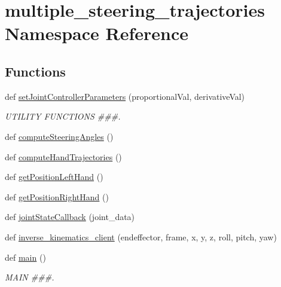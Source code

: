 \hypertarget{namespacemultiple__steering__trajectories}{}\section{multiple\+\_\+steering\+\_\+trajectories Namespace Reference}
\label{namespacemultiple__steering__trajectories}
\subsection*{Functions}
\begin{DoxyCompactItemize}
\item 
def \mbox{\hyperlink{namespacemultiple__steering__trajectories_af90cd52b922ac6445b4a85b68bd2ecaa}{set\+Joint\+Controller\+Parameters}} (proportional\+Val, derivative\+Val)
\begin{DoxyCompactList}\small\item\em U\+T\+I\+L\+I\+TY F\+U\+N\+C\+T\+I\+O\+NS \#\#\#. \end{DoxyCompactList}\item 
def \mbox{\hyperlink{namespacemultiple__steering__trajectories_a08df8005f8e762c69091b10fb41dcfab}{compute\+Steering\+Angles}} ()
\item 
def \mbox{\hyperlink{namespacemultiple__steering__trajectories_ac0bd17bffe2692eebdd71240e34898d8}{compute\+Hand\+Trajectories}} ()
\item 
def \mbox{\hyperlink{namespacemultiple__steering__trajectories_a41b782709b3d39d5c107df5a3daceac6}{get\+Position\+Left\+Hand}} ()
\item 
def \mbox{\hyperlink{namespacemultiple__steering__trajectories_af66c0fe5d3734e718f496e10a7cb0ffd}{get\+Position\+Right\+Hand}} ()
\item 
def \mbox{\hyperlink{namespacemultiple__steering__trajectories_a45c341c555b53c24083a5007b64fc97d}{joint\+State\+Callback}} (joint\+\_\+data)
\item 
def \mbox{\hyperlink{namespacemultiple__steering__trajectories_a8d776c95f9bc7ef55e3e16f63534f31f}{inverse\+\_\+kinematics\+\_\+client}} (endeffector, frame, x, y, z, roll, pitch, yaw)
\item 
def \mbox{\hyperlink{namespacemultiple__steering__trajectories_a15f8b728db5205306d8719949c85e0d8}{main}} ()
\begin{DoxyCompactList}\small\item\em M\+A\+IN \#\#\#. \end{DoxyCompactList}\end{DoxyCompactItemize}

